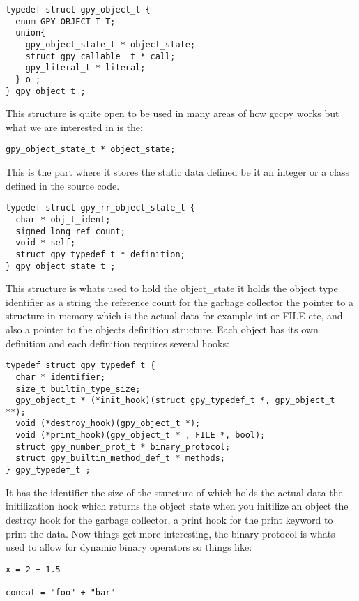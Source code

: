 \documentclass[defaultstyle,11pt]{article}
\begin{document}
\begin{lstlisting}
typedef struct gpy_object_t {
  enum GPY_OBJECT_T T;
  union{
    gpy_object_state_t * object_state;
    struct gpy_callable__t * call;
    gpy_literal_t * literal;
  } o ;
} gpy_object_t ;
\end{lstlisting}

This structure is quite open to be used in many areas of how gccpy works but what we are interested in is the:

\begin{lstlisting}
gpy_object_state_t * object_state;
\end{lstlisting}

This is the part where it stores the static data defined be it an integer or a class defined in the source code.

\begin{lstlisting}
typedef struct gpy_rr_object_state_t {
  char * obj_t_ident;
  signed long ref_count;
  void * self;
  struct gpy_typedef_t * definition;
} gpy_object_state_t ;
\end{lstlisting}

This structure is whats used to hold the object\_state it holds the object type identifier as a string the reference
count for the garbage collector the pointer to a structure in memory which is the actual data for example int or FILE \*
etc, and also a pointer to the objects definition structure. Each object has its own definition and each definition requires
several hooks:

\begin{lstlisting}
typedef struct gpy_typedef_t {
  char * identifier;
  size_t builtin_type_size;
  gpy_object_t * (*init_hook)(struct gpy_typedef_t *, gpy_object_t **);
  void (*destroy_hook)(gpy_object_t *);
  void (*print_hook)(gpy_object_t * , FILE *, bool);
  struct gpy_number_prot_t * binary_protocol;
  struct gpy_builtin_method_def_t * methods;
} gpy_typedef_t ;
\end{lstlisting}

It has the identifier the size of the sturcture of which holds the actual data the initilization hook
which returns the object state when you initilize an object the destroy hook for the garbage collector,
a print hook for the print keyword to print the data. Now things get more interesting, the binary protocol
is whats used to allow for dynamic binary operators so things like:

\begin{lstlisting}
x = 2 + 1.5

concat = "foo" + "bar"
\end{lstlisting}
\end{document}
